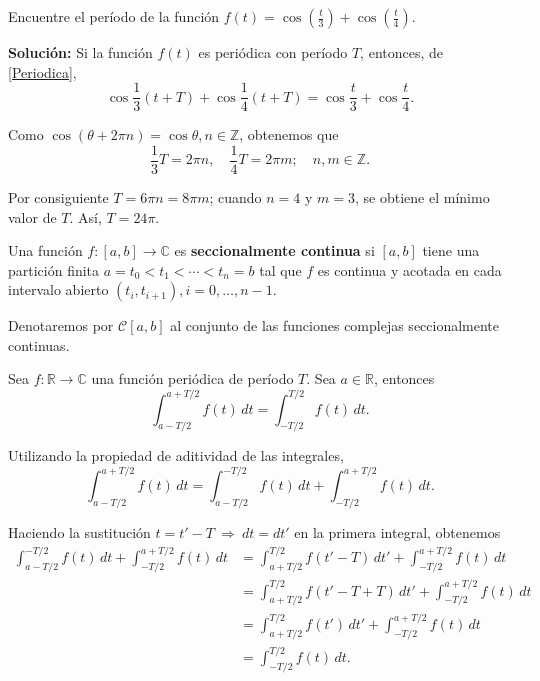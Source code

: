 \begin{ejemplo}
Encuentre el período de la función $f(t) = \cos \left(\frac{t}{3}\right) + \cos \left(\frac{t}{4}\right)$.

\textbf{Solución:} Si la función $f(t)$ es periódica con período $T$, entonces, de \eqref{Periodica},
$$\cos \frac{1}{3}(t + T) + \cos \frac{1}{4}(t + T) = \cos \frac{t}{3} + \cos \frac{t}{4}.$$

Como $\cos(\theta + 2\pi n) = \cos \theta, n \in \mathbb{Z}$, obtenemos que 
$$\frac{1}{3} T = 2\pi n, \quad \frac{1}{4}T = 2\pi m; \quad n,m \in \mathbb{Z}.$$

Por consiguiente $T = 6\pi n = 8\pi m$; cuando $n = 4$ y $m=3$, se obtiene el mínimo valor de $T$. Así, $T = 24\pi$.
\end{ejemplo}

\begin{defi} 
    Una función $f: [a,b] \longrightarrow \mathbb{C}$ es \textbf{seccionalmente continua} si $[a,b]$ tiene una partición finita $a = t_0 < t_1 < \cdots < t_n = b$ tal que $f$ es continua y acotada en cada intervalo abierto $(t_i, t_{i+1}), i = 0, \dots, n-1$.
    
    Denotaremos por $\mathscr{C}[a,b]$ al conjunto de las funciones complejas seccionalmente continuas.
\end{defi}


\begin{propo}
Sea $f: \mathbb{R} \longrightarrow \mathbb{C}$ una función periódica de período $T$. Sea $a \in \mathbb{R}$, entonces
$$ \int_{a-T/2}^{a + T/2} f(t) \,dt = \int_{- T/2}^{T/2} f(t) \,dt .$$
\end{propo}

\begin{demo}
Utilizando la propiedad de aditividad de las integrales,
\begin{equation*}
    \int_{a-T/2}^{a + T/2} f(t) \,dt = \int_{a - T/2}^{-T/2} f(t) \,dt + \int_{- T/2}^{a + T/2} f(t) \,dt.
\end{equation*}

Haciendo la sustitución  $t = t' - T ~\Rightarrow~ dt = dt'$ en la primera integral, obtenemos
\begin{align*}
   \int_{a - T/2}^{-T/2}f(t) \,dt + \int_{- T/2}^{a + T/2} f(t) \,dt   &= \int_{a + T/2}^{T/2} f(t'-T) \,dt' + \int_{- T/2}^{a + T/2} f(t) \,dt \\
   &= \int_{a + T/2}^{T/2} f(t'-T + T) \,dt' + \int_{- T/2}^{a + T/2} f(t) \,dt \\
   &= \int_{a + T/2}^{T/2} f(t') \,dt' + \int_{-T/2}^{a + T/2} f(t) \,dt \\
   &= \int_{-T/2}^{T/2} f(t) \,dt.
\end{align*}
\end{demo}

